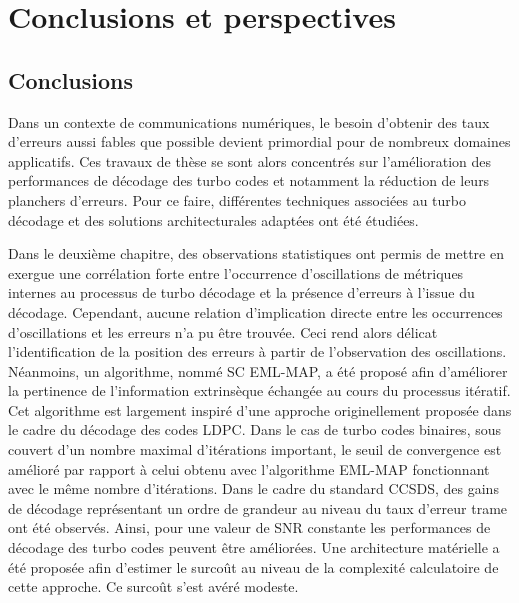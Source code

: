 \chapter*{Conclusions et perspectives}
\section*{Conclusions}
Dans un contexte de communications numériques,
le besoin d'obtenir des taux d'erreurs aussi fables que possible devient primordial pour de nombreux domaines 
applicatifs. Ces travaux de thèse se sont alors concentrés sur l'amélioration des performances de décodage des turbo 
codes et notamment la réduction de leurs planchers d'erreurs. Pour ce faire, différentes techniques associées au turbo 
décodage et des solutions architecturales adaptées ont été étudiées.


Dans le deuxième chapitre, des observations statistiques ont permis de mettre en exergue une corrélation forte entre 
l’occurrence d'oscillations de métriques internes au processus de turbo décodage et la présence d'erreurs à l'issue du
décodage. Cependant, aucune relation d'implication directe entre les occurrences d'oscillations et les erreurs n'a pu
être trouvée. Ceci rend alors délicat l'identification de la position des erreurs à partir de l'observation
des oscillations. Néanmoins, un algorithme, nommé SC EML-MAP, a été proposé afin d'améliorer la pertinence de l'information extrinsèque 
échangée au cours du processus itératif. Cet algorithme est largement inspiré d'une approche originellement proposée 
dans le cadre du décodage des codes LDPC. Dans le cas de turbo codes binaires, sous couvert d'un nombre maximal d'itérations
important, le seuil de convergence est amélioré par rapport à celui obtenu avec 
l'algorithme EML-MAP fonctionnant avec le même nombre 
d'itérations. Dans le cadre du standard CCSDS, des gains de décodage représentant un ordre de grandeur au niveau du taux 
d'erreur trame ont été observés. Ainsi, pour une valeur de SNR constante les performances de décodage des turbo codes
peuvent être améliorées. Une architecture matérielle a été proposée afin d'estimer le surcoût au niveau de la 
complexité calculatoire de cette approche. Ce surcoût s'est avéré modeste.


